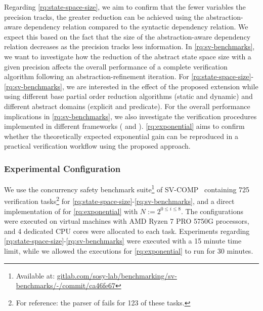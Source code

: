 \documentclass[numbook]{svjour3}
\begin{document}
Regarding \ref{rq:state-space-size}, we aim to confirm that the fewer variables the precision tracks, the greater reduction can be achieved using the abstraction-aware dependency relation compared to the syntactic dependency relation. We expect this based on the fact that the size of the abstraction-aware dependency relation decreases as the precision tracks less information. In \ref{rq:sv-benchmarks}, we want to investigate how the reduction of the abstract state space size with a given precision affects the overall performance of a complete verification algorithm following an abstraction-refinement iteration. For \ref{rq:state-space-size}-\ref{rq:sv-benchmarks}, we are interested in the effect of the proposed extension while using different base partial order reduction algorithms (static and dynamic) and different abstract domains (explicit and predicate). For the overall performance implications in \ref{rq:sv-benchmarks}, we also investigate the verification procedures implemented in different frameworks (\Th{} and \CPA). \ref{rq:exponential} aims to confirm whether the theoretically expected exponential gain can be reproduced in a practical verification workflow using the proposed approach.

\subsubsection{Experimental Configuration}
\label{sec:por-techdetails}

We use the concurrency safety benchmark suite\footnote{Available at: \href{https://gitlab.com/sosy-lab/benchmarking/sv-benchmarks/-/commit/ca46fe670b5dcbcd3495bd23689353a8ea1fb86b}{gitlab.com/sosy-lab/benchmarking/sv-benchmarks/-/commit/ca46fe67}} of SV-COMP~\cite{svcomp-2025} containing 725 verification tasks\footnote{For reference: the parser of \Th{} fails for 123 of these tasks.} for \ref{rq:state-space-size}-\ref{rq:sv-benchmarks}, and a direct implementation of  for \ref{rq:exponential} with $N:=2^{0 \le i \le 8}$.
The configurations were executed on virtual machines with AMD Ryzen 7 PRO 5750G processors, and 4 dedicated CPU cores were allocated to each task.
Experiments regarding \ref{rq:state-space-size}-\ref{rq:sv-benchmarks} were executed with a 15 minute time limit, while we allowed the executions for \ref{rq:exponential} to run for 30 minutes.
\end{document}
